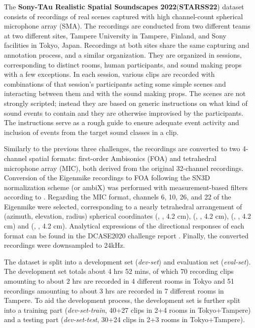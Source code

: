 \documentclass{article}
\begin{document}
\begin{sloppy}
The \textbf{Sony-TAu Realistic Spatial Soundscapes 2022}(\textbf{STARSS22}) dataset consists of recordings of real scenes captured with high channel-count spherical microphone array (SMA). The recordings are conducted from two different teams at two different sites, Tampere University in Tampere, Finland, and Sony facilities in Tokyo, Japan. Recordings at both sites share the same capturing and annotation process, and a similar organization. They are organized in sessions, corresponding to distinct rooms, human participants, and sound making props with a few exceptions. In each session, various clips are recorded with combinations of that session's participants acting some simple scenes and interacting between them and with the sound making props. The scenes are not strongly scripted; instead they are based on generic instructions on what kind of sound events to contain and they are otherwise improvised by the participants. The instructions serve as a rough guide to ensure adequate event activity and inclusion of events from the target sound classes in a clip. 

Similarly to the previous three challenges, the recordings are converted to two 4-channel spatial formats: first-order Ambisonics (FOA) and tetrahedral microphone array (MIC), both derived from the original 32-channel recordings. Conversion of the Eigenmike recordings to FOA following the SN3D normalization scheme (or ambiX) was performed with measurement-based filters according to \cite{politis2017comparing}. Regarding the MIC format, channels 6, 10, 26, and 22 of the Eigenmike were selected, corresponding to a nearly tetrahedral arrangement of (azimuth, elevation, radius) spherical coordinates (, , 4.2 cm), (, , 4.2 cm), (, , 4.2 cm) and (, , 4.2 cm). Analytical expressions of the directional responses of each format can be found in the DCASE2020 challenge report \cite{Politis2020}. Finally, the converted recordings were downsampled to 24kHz.

The dataset is split into a development set (\emph{dev-set}) and evaluation set (\emph{eval-set}). The development set totals about 4 hrs 52 mins, of which 70 recording clips amounting to about 2 hrs are recorded in 4 different rooms in Tokyo and 51 recordings amounting to about 3 hrs are recorded in 7 different rooms in Tampere. To aid the development process, the development set is further split into a training part (\emph{dev-set-train}, 40+27 clips in 2+4 rooms in Tokyo+Tampere) and a testing part (\emph{dev-set-test}, 30+24 clips in 2+3 rooms in Tokyo+Tampere).






\end{sloppy}
\end{document}
